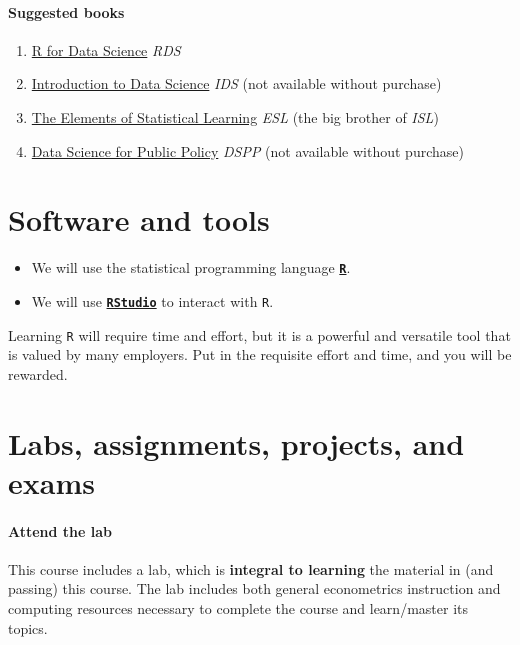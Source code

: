 \documentclass[10pt]{article}
\newcommand{\emf}[1]{\textbf{\textcolor{grass_green}{#1}}}
\begin{document}
\paragraph{Suggested books}

\begin{enumerate}
\item \href{https://r4ds.had.co.nz/}{R for Data Science} \textit{RDS}
\item \href{https://www.springer.com/us/book/9783319500164}{Introduction to Data Science} \textit{IDS} (not available without purchase)
\item \href{http://web.stanford.edu/~hastie/ElemStatLearn/}{The Elements of Statistical Learning} \textit{ESL} (the big brother of \textit{ISL})
\item \href{https://link.springer.com/book/10.1007/978-3-030-71352-2}{Data Science for Public Policy} \textit{DSPP} (not available without purchase)

\end{enumerate}

\section*{Software and tools}

\begin{itemize}
  \item We will use the statistical programming language \href{https://www.r-project.org/}{\textbf{\texttt{R}}}.
  \item We will use \href{https://www.rstudio.com}{\textbf{\texttt{RStudio}}} to interact with \texttt{R}.
\end{itemize}
Learning \texttt{R} will require time and effort, but it is a powerful and versatile tool that is valued by many employers. Put in the requisite effort and time, and you will be rewarded.

\section*{Labs, assignments, projects, and exams}

\paragraph{Attend the lab} This course includes a lab, which is \emf{integral to learning} the material in (and passing) this course. The lab includes both general econometrics instruction and computing resources necessary to complete the course and learn/master its topics.
\end{document}
